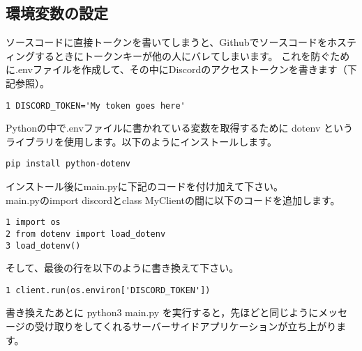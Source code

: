 \subsection{環境変数の設定}
ソースコードに直接トークンを書いてしまうと、Githubでソースコードをホスティングするときにトークンキーが他の人にバレてしまいます。
これを防ぐために.envファイルを作成して、その中にDiscordのアクセストークンを書きます（下記参照）。
\begin{tcolorbox}[breakable]
  \begin{verbatim}
1 DISCORD_TOKEN='My token goes here'
\end{verbatim}
\end{tcolorbox}
Pythonの中で.envファイルに書かれている変数を取得するために dotenv というライブラリを使用します。以下のようにインストールします。
\begin{shaded}
  \begin{verbatim}
pip install python-dotenv
\end{verbatim}
\end{shaded}
インストール後にmain.pyに下記のコードを付け加えて下さい。\\
main.pyのimport discordとclass MyClientの間に以下のコードを追加します。
\begin{tcolorbox}[breakable]
  \begin{verbatim}
1 import os
2 from dotenv import load_dotenv
3 load_dotenv()
\end{verbatim}
\end{tcolorbox}
そして、最後の行を以下のように書き換えて下さい。
\begin{tcolorbox}[breakable]
  \begin{verbatim}
1 client.run(os.environ['DISCORD_TOKEN'])
\end{verbatim}
\end{tcolorbox}
書き換えたあとに python3 main.py を実行すると，先ほどと同じようにメッセージの受け取りをしてくれるサーバーサイドアプリケーションが立ち上がります。

